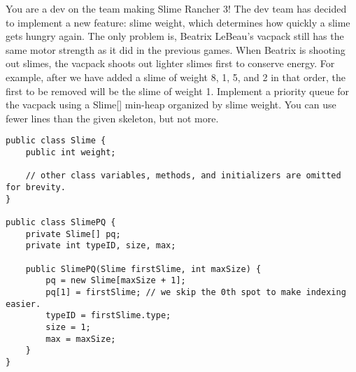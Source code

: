 \begin{blocksection}
You are a dev on the team making Slime Rancher 3! The dev team has decided to implement a new feature: slime weight, which determines how quickly a slime gets hungry again. The only problem is, Beatrix LeBeau's vacpack still has the same motor strength as it did in the previous games. When Beatrix is shooting out slimes, the vacpack shoots out lighter slimes first to conserve energy. For example, after we have added a slime of weight 8, 1, 5, and 2 in that order, the first to be removed will be the slime of weight 1. Implement a priority queue for the vacpack using a Slime[] min-heap organized by slime weight. You can use fewer lines than the given skeleton, but not more.
\\
\begin{lstlisting}
public class Slime {
    public int weight;
    
    // other class variables, methods, and initializers are omitted for brevity.
}

public class SlimePQ {
    private Slime[] pq;
    private int typeID, size, max;
    
    public SlimePQ(Slime firstSlime, int maxSize) {
        pq = new Slime[maxSize + 1];
        pq[1] = firstSlime; // we skip the 0th spot to make indexing easier.
        typeID = firstSlime.type;
        size = 1;
        max = maxSize;
    }
}
\end{lstlisting}
\clearpage
\end{blocksection}